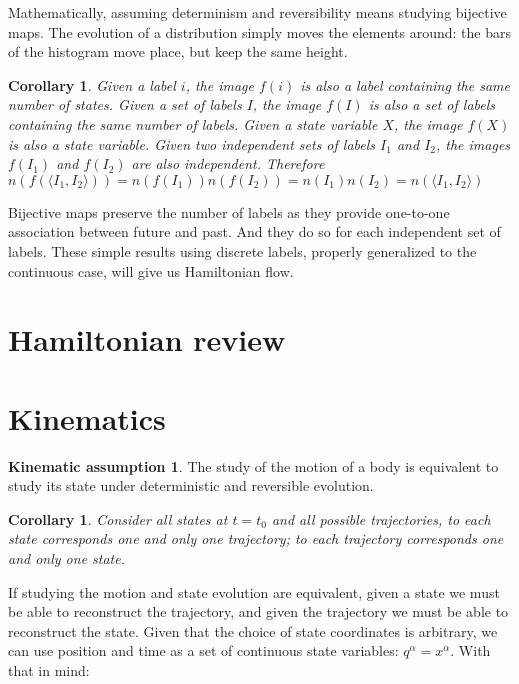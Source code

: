 \documentclass[aps,pra,10pt,twocolumn,floatfix,nofootinbib]{revtex4-1}
\newtheorem{cor}[thm]{Corollary}
\theoremstyle{definition}
\newtheorem*{assump3}{Kinematic assumption}
\begin{document}
Mathematically, assuming determinism and reversibility means studying bijective maps. The evolution of a distribution simply moves the elements around: the bars of the histogram move place, but keep the same height.

\begin{cor}\label{labelsCount}
Given a label $i$, the image $f(i)$ is also a label containing the same number of states. Given a set of labels $I$, the image $f(I)$ is also a set of labels containing the same number of labels. Given a state variable $X$, the image $f(X)$ is also a state variable. Given two independent sets of labels $I_1$ and $I_2$, the images $f(I_1)$ and $f(I_2)$ are also independent. Therefore $n(f(\langle I_1, I_2 \rangle))=n(f(I_1))n(f(I_2))=n(I_1)n(I_2)=n(\langle I_1, I_2 \rangle)$
\end{cor}

Bijective maps preserve the number of labels as they provide one-to-one association between future and past. And they do so for each independent set of labels. These simple results using discrete labels, properly generalized to the continuous case, will give us Hamiltonian flow.


\section{Hamiltonian review}

\section{Kinematics}
\begin{assump3}\label{kinematicAssumption}
The study of the motion of a body is equivalent to study its state under deterministic and reversible evolution.
\end{assump3}

\begin{cor}\label{}
Consider all states at $t=t_0$ and all possible trajectories, to each state corresponds one and only one trajectory; to each trajectory corresponds one and only one state.
\end{cor}

If studying the motion and state evolution are equivalent, given a state we must be able to reconstruct the trajectory, and given the trajectory we must be able to reconstruct the state. Given that the choice of state coordinates is arbitrary, we can use position and time as a set of continuous state variables: $q^\alpha = x^\alpha$. With that in mind:
\end{document}
